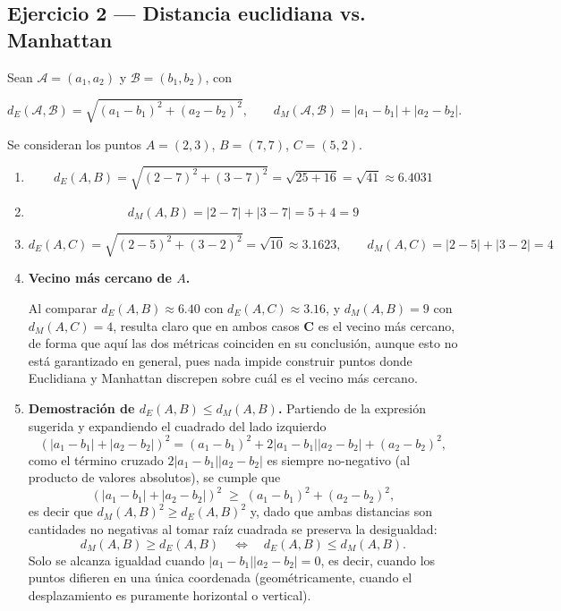 \subsection{Ejercicio 2 --- Distancia euclidiana vs. Manhattan}

Sean $\mathcal A=(a_1,a_2)$ y $\mathcal B=(b_1,b_2)$, con

\[
    d_E(\mathcal A,\mathcal B) = \sqrt{(a_1-b_1)^2+(a_2-b_2)^2}, \qquad
    d_M(\mathcal A,\mathcal B) = |a_1-b_1|+|a_2-b_2|.
\]

Se consideran los puntos $A=(2,3)$, $B=(7,7)$, $C=(5,2)$.

\begin{enumerate}

\item
\[
    d_E(A,B) = \sqrt{(2-7)^2+(3-7)^2} = \sqrt{25+16} = \sqrt{41} \approx 6.4031
\]

\item
\[
    d_M(A,B) = |2-7|+|3-7| = 5+4 = 9
\]

\item
\[
    d_E(A,C) = \sqrt{(2-5)^2+(3-2)^2} = \sqrt{10} \approx 3.1623,
    \qquad
    d_M(A,C) = |2-5|+|3-2| = 4
\]

\item \textbf{Vecino más cercano de $A$.}
{\sloppy Al comparar $d_E(A,B)\approx 6.40$ con $d_E(A,C)\approx 3.16$,
y $d_M(A,B)=9$ con $d_M(A,C)=4$, resulta claro que en ambos casos
\textbf{C} es el vecino más cercano, de forma que aquí las dos
métricas coinciden en su conclusión, aunque esto no está garantizado
en general, pues nada impide construir puntos donde Euclidiana y
Manhattan discrepen sobre cuál es el vecino más cercano.\par}

\item \textbf{Demostración de $d_E(A,B)\le d_M(A,B)$.}
Partiendo de la expresión sugerida y expandiendo el cuadrado del lado
izquierdo
\[
    (|a_1-b_1|+|a_2-b_2|)^2 = (a_1-b_1)^2 + 2|a_1-b_1||a_2-b_2| + (a_2-b_2)^2 ,
\]
como el término cruzado $2|a_1-b_1||a_2-b_2|$ es siempre no-negativo
(al producto de valores absolutos), se cumple que
\[
    (|a_1-b_1|+|a_2-b_2|)^2 \;\ge\; (a_1-b_1)^2+(a_2-b_2)^2,
\]
es decir que $d_M(A,B)^2 \ge d_E(A,B)^2$ y, dado que ambas distancias son
cantidades no negativas al tomar raíz cuadrada se
preserva la desigualdad:
\[
    d_M(A,B) \ge d_E(A,B) \quad\Longleftrightarrow\quad d_E(A,B)\le d_M(A,B).
\]
Solo se alcanza igualdad cuando $|a_1-b_1||a_2-b_2|=0$, es decir,
cuando los puntos difieren en una única coordenada (geométricamente,
cuando el desplazamiento es puramente horizontal o vertical).

\end{enumerate}

